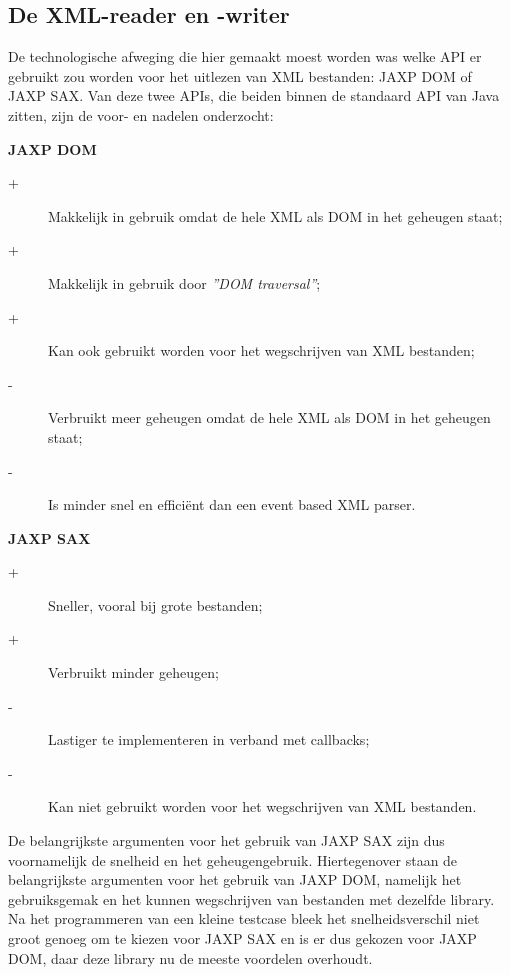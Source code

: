 \documentclass[a4paper,11pt,titlepage]{scrartcl}
\begin{document}
\subsection{De XML-reader en -writer}
De technologische afweging die hier gemaakt moest worden was welke API er gebruikt zou worden voor het uitlezen van XML bestanden: JAXP DOM of JAXP SAX. Van deze twee APIs, die beiden binnen de standaard API van Java zitten, zijn de voor- en nadelen onderzocht:
\begin{description}
	\item \textbf{JAXP DOM}
		\begin{description}
			\item[+] Makkelijk in gebruik omdat de hele XML als DOM in het geheugen staat;
			\item[+] Makkelijk in gebruik door \textit{''DOM traversal''};
			\item[+] Kan ook gebruikt worden voor het wegschrijven van XML bestanden;
			\item[-] Verbruikt meer geheugen omdat de hele XML als DOM in het geheugen staat;
			\item[-] Is minder snel en efficiënt dan een event based XML parser.
		\end{description}
	\item \textbf{JAXP SAX}
		\begin{description}
			\item[+] Sneller, vooral bij grote bestanden;
			\item[+] Verbruikt minder geheugen;
			\item[-] Lastiger te implementeren in verband met callbacks;
			\item[-] Kan niet gebruikt worden voor het wegschrijven van XML bestanden.
		\end{description}
\end{description}

De belangrijkste argumenten voor het gebruik van JAXP SAX zijn dus voornamelijk de snelheid en het geheugengebruik. Hiertegenover staan de belangrijkste argumenten voor het gebruik van JAXP DOM, namelijk het gebruiksgemak en het kunnen wegschrijven van bestanden met dezelfde library. Na het programmeren van een kleine testcase bleek het snelheidsverschil niet groot genoeg om te kiezen voor JAXP SAX en is er dus gekozen voor JAXP DOM, daar deze library nu de meeste voordelen overhoudt.
\end{document}
